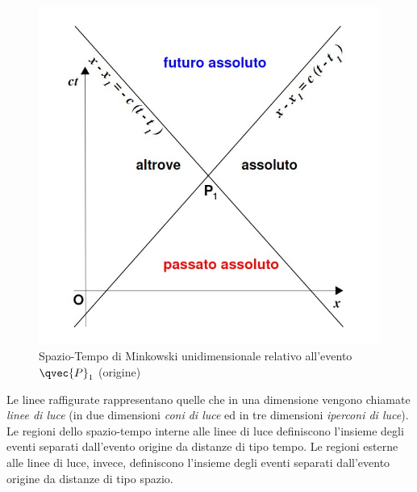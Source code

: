 \begin{figure}[ht]
  \centering
  \includegraphics[scale=0.5]{./img/2020_03_20/minkowski.jpg}
  \caption{Spazio-Tempo di Minkowski unidimensionale relativo all'evento
  $\qvec{P}_1$ (origine)}
  \label{fig:minkowski}
\end{figure}

Le linee raffigurate rappresentano quelle che in una dimensione vengono
chiamate \textit{linee di luce} (in due dimensioni \textit{coni di luce}
ed in tre dimensioni \textit{iperconi di luce}). Le regioni dello spazio-tempo
interne alle linee di luce definiscono l'insieme degli eventi separati
dall'evento origine da distanze	di tipo tempo. Le regioni esterne alle linee di
luce, invece, definiscono l'insieme degli eventi separati dall'evento origine
da distanze di tipo spazio.

